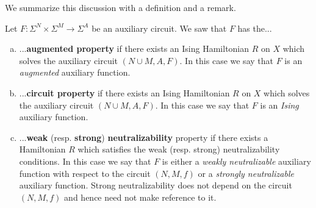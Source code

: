 \documentclass{article}
\begin{document}
We summarize this discussion with a definition and a remark.

\begin{defn}\label{defn:properties_of_aux_function}
  Let $F:\Sigma^N \times \Sigma^M \to \Sigma^A$ be an auxiliary circuit. We saw that $F$ has the...
\begin{enumerate}[(a)]
  \item ...\textbf{augmented property} if there exists an Ising Hamiltonian $R$ on $X$ which solves the auxiliary circuit $(N\cup M, A,F)$. In this case we say that $F$ is an \emph{augmented} auxiliary function.
  \item ...\textbf{circuit property} if there exists an Ising Hamiltonian $R$ on $X$ which solves the auxiliary circuit $(N\cup M,A,F)$. In this case we say that $F$ is an \emph{Ising} auxiliary function.
  \item ...\textbf{weak} (resp. \textbf{strong}) \textbf{neutralizability} property if there exists a Hamiltonian $R$ which satisfies the weak (resp. strong) neutralizability conditions. In this case we say that $F$ is either a \emph{weakly neutralizable} auxiliary function with respect to the circuit $(N,M,f)$ or a \emph{strongly neutralizable} auxiliary function. Strong neutralizability does not depend on the circuit $(N,M,f)$ and hence need not make reference to it.
\end{enumerate}
\end{defn}
\end{document}
